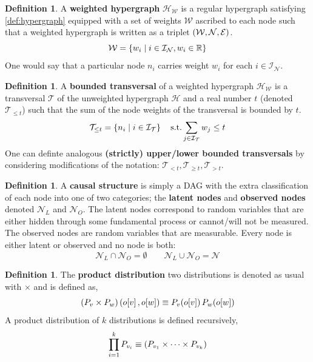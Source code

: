 \documentclass[aps, 10pt, english, twoside, pra, nofootinbib, longbibliography]{revtex4-1}
\theoremstyle{plain}
\theoremstyle{definition}
\newtheorem{definition}[theorem]{Definition}
\theoremstyle{remark}
\newcommand{\hgraph}{\mathcal{H}}
\newcommand{\nodes}{\mathcal{N}}
\newcommand{\weights}{\mathcal{W}}
\newcommand{\edges}{\mathcal{E}}
\newcommand{\trans}{\mathcal{T}}
\newcommand{\ind}{\mathcal{I}}
\newcommand{\term}[1]{\textcolor{Mahogany}{\textbf{#1}}}
\newcommand{\outc}[1]{o\!\bs{#1}} %
\begin{document}
    \begin{definition}
        A \term{weighted hypergraph} $\hgraph_\weights$ is a regular hypergraph satisfying \cref{def:hypergraph} equipped with a set of weights $\weights$ ascribed to each node such that a weighted hypergraph is written as a triplet $\br{\weights, \nodes, \edges}$.
        \[ \weights = \bc{w_i \mid i \in \ind_\nodes, w_i \in \R} \]
        One would say that a particular node $n_i$ carries weight $w_i$ for each $i \in \ind_\nodes$.
    \end{definition}

    \begin{definition}
        A \term{bounded transversal} of a weighted hypergraph $\hgraph_\weights$ is a transversal $\trans$ of the unweighted hypergraph $\hgraph$ and a real number $t$ (denoted $\trans_{\leq t}$) such that the sum of the node weights of the transversal is bounded by $t$.
        \[ \trans_{\leq t} = \bc{n_i \mid i \in \ind_\trans} \quad \text{s.t.} \sum_{j\in\ind_\trans} w_j \leq t \]
        One can definte analogous \term{(strictly) upper/lower bounded transversals} by considering modifications of the notation: $\trans_{< t}, \trans_{\geq t}, \trans_{> t}$.
    \end{definition}

    \begin{definition}
        A \term{causal structure} is simply a DAG with the extra classification of each node into one of two categories; the \term{latent nodes} and \term{observed nodes} denoted $\nodes_L$ and $\nodes_O$. The latent nodes correspond to random variables that are either hidden through some fundamental process or cannot/will not be measured. The observed nodes are random variables that are measurable. Every node is either latent or observed and no node is both:
        \[ \nodes_L \cap \nodes_O = \emptyset \qquad \nodes_L \cup \nodes_O = \nodes \]
    \end{definition}

    \begin{definition}
        The \term{product distribution} two distributions is denoted as usual with $\times$ and is defined as,
        \[ \br{\prob[v] \times \prob[w]}\br{\outc{v}, \outc{w}} \defined \prob[v][\outc{v}]\prob[w][\outc{w}] \]
        A product distribution of $k$ distributions is defined recursively,
        \[ \prod_{i=1}^{k} \prob[v_i] \defined \br{\prob[v_1] \times \cdots \times \prob[v_k]} \]
    \end{definition}
\end{document}

